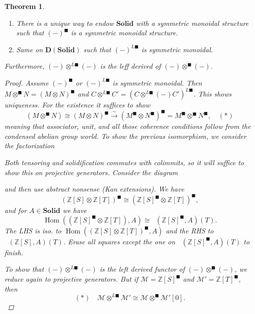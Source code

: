 \documentclass[12pt]{article}
\theoremstyle{darkgreentheorem}
\newtheorem{thm}{Theorem}[section]
\theoremstyle{darkbluedefinition}
\theoremstyle{darkredexample}
\theoremstyle{remark}
\newcommand{\Z}{\mathbb{Z}}
\newcommand{\1}{\mathbbm{1}}
\newcommand{\D}{\mathbf{D}}
\newcommand{\Solid}{\mathbf{Solid}}
\newcommand{\M}{\mathcal{M}}
\DeclareMathOperator{\Hom}{Hom}
\DeclareMathOperator{\Cond}{Cond}
\DeclareMathOperator{\ihom}{\underline{Hom}}
\newcommand{\ot}{\otimes}
\newcommand{\tms}{\times}
\newcommand{\solid}{^{\blacksquare}}
\newcommand{\dsolid}{^{L\blacksquare}}
\begin{document}
\begin{thm}
    \begin{enumerate}
	\item There is a unique way to endow $\Solid$ with a symmetric monoidal structure such that $(-)\solid$ is a symmetric monoidal structure.
	\item Same on $\D(\Solid)$ such that $(-)\dsolid$ is symmetric monoidal.
    \end{enumerate}
    Furthermore, $(-)\ot\dsolid (-)$ is the leff derived of $(-)\ot\solid(-)$.
    \begin{proof}
	Assume $(-)\solid$ or $(-)\dsolid$ is symmetric monoidal.
	Then $M\ot\solid N=(M\ot N)\solid$ and $C\ot\dsolid C'=(C\ot\dsolid(-)C')\dsolid$.
	This shows uniqueness.
	For the existence it suffices to show
	\[ (M\ot\solid N)\cong (M\ot N)\solid\xrightarrow{\sim} (M\solid\ot N\solid)\solid=M\solid\ot\solid N\solid, \quad (*)\]
	meaning that associator, unit, and all those coherence conditions follow from the condensed abelian group world.
	To show the previous isomorphism, we consider the factorization
	\begin{center}
	\end{center}
	Both tensoring and solidification commutes with colimmits, so it will suffice to show this on projective generators.
	Consider the diagram
	\begin{center}
	\end{center}
	and then use abstract nonsense (Kan extensions).
	We have
	\[(\Z[S]\ot \Z[T])\solid \cong (\Z[S]\solid\ot \Z[T])\solid,\]
	and for $A\in \Solid$ we have
	\[ \Hom((\Z[S]\solid \ot \Z[T]),A)\cong \ihom(\Z[S]\solid,A)(T).\]
	The LHS is iso. to $\Hom((\Z[S]\ot \Z[T])\solid,A)$ and the RHS to $\ihom(\Z[S],A)(T)$.
	Erase all squares except the one on $\ihom(\Z[S]\solid,A)(T)$ to finish.
	
	To show that $(-)\ot\dsolid (-)$ is the left derived functor of $(-)\ot\solid(-)$, we reduce again to projective generators.
	But if $\M=\Z[S]\solid $ and $\M'=\Z[T]\solid$, then
	\[ (*)\quad \M\ot\dsolid\M'\cong \M\ot\solid \M'[0].\]
    \end{proof}
\end{thm}
\end{document}
